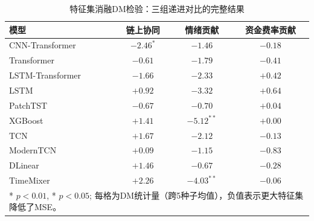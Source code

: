 \begin{table}[ht]
\centering
\caption{特征集消融DM检验：三组递进对比的完整结果}
\label{tab:dm_feature_sets_full}
\footnotesize
\setlength{\tabcolsep}{2.5pt}
\begin{tabular}{lccc}
\toprule
模型 & 链上协同 & 情绪贡献 & 资金费率贡献 \\
\midrule
CNN-Transformer & $-2.46^{*}$ & $-1.46$ & $-0.18$ \\
Transformer & $-0.61$ & $-1.79$ & $-0.41$ \\
LSTM-Transformer & $-1.66$ & $-2.33$ & $+0.42$ \\
LSTM & $+0.92$ & $-3.32$ & $+0.64$ \\
PatchTST & $-0.67$ & $-0.70$ & $+0.04$ \\
XGBoost & $+1.41$ & $-5.12^{**}$ & $+0.00$ \\
TCN & $+1.67$ & $-2.12$ & $-0.13$ \\
ModernTCN & $+0.09$ & $-1.15$ & $-0.83$ \\
DLinear & $+1.46$ & $-0.67$ & $-0.28$ \\
TimeMixer & $+2.26$ & $-4.03^{**}$ & $-0.06$ \\
\bottomrule
\multicolumn{4}{p{\textwidth}}{\footnotesize ** $p<0.01$, * $p<0.05$; 每格为DM统计量（跨5种子均值），负值表示更大特征集降低了MSE。}
\end{tabular}
\end{table}

